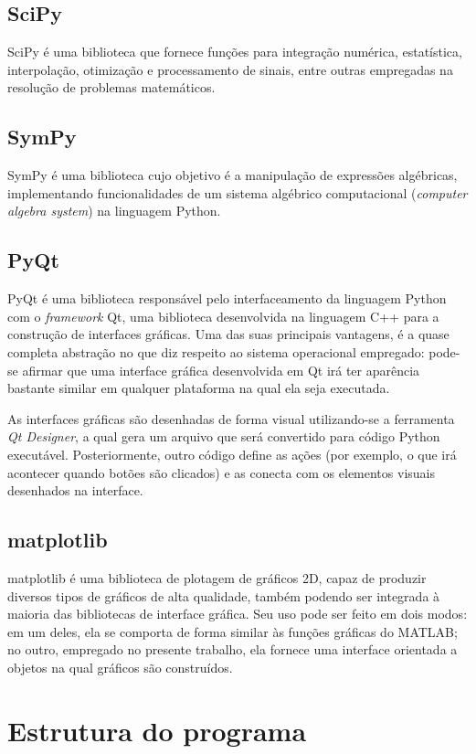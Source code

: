 \subsection{SciPy}
SciPy é uma biblioteca que fornece funções para integração numérica, estatística, interpolação, otimização e processamento de sinais, entre outras empregadas na resolução de problemas matemáticos.

\subsection{SymPy}
SymPy \cite{sympydoc} é uma biblioteca cujo objetivo é a manipulação de expressões algébricas, implementando funcionalidades de um sistema algébrico computacional (\textit{computer algebra system}) na linguagem Python. 

\subsection{PyQt}
PyQt é uma biblioteca responsável pelo interfaceamento da linguagem Python com o \textit{framework} Qt, uma biblioteca desenvolvida na linguagem C++ para a construção de interfaces gráficas. Uma das suas principais vantagens, é a quase completa abstração no que diz respeito ao sistema operacional empregado: pode-se afirmar que uma interface gráfica desenvolvida em Qt irá ter aparência bastante similar em qualquer plataforma na qual ela seja executada.

As interfaces gráficas são desenhadas de forma visual utilizando-se a ferramenta \textit{Qt Designer}, a qual gera um arquivo que será convertido para código Python executável. Posteriormente, outro código define as ações (por exemplo, o que irá acontecer quando botões são clicados) e as conecta com os elementos visuais desenhados na interface.

\subsection{matplotlib}
matplotlib é uma biblioteca de plotagem de gráficos 2D, capaz de produzir diversos tipos de gráficos de alta qualidade, também podendo ser integrada à maioria das bibliotecas de interface gráfica. Seu uso pode ser feito em dois modos: em um deles, ela se comporta de forma similar às funções gráficas do MATLAB; no outro, empregado no presente trabalho, ela fornece uma interface orientada a objetos na qual gráficos são construídos.


\section{Estrutura do programa}

